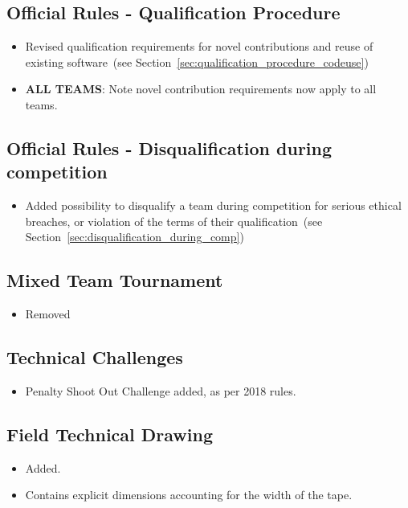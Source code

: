 \documentclass[12pt]{article}
\newcommand{\cf}{see\xspace}
\begin{document}
\subsection*{Official Rules - Qualification Procedure}
\begin{itemize}
  \item Revised qualification requirements for novel contributions and reuse of existing software~(\cf Section~\ref{sec:qualification_procedure_codeuse})
  \item \textbf{ALL TEAMS}: Note novel contribution requirements now apply to all teams.
\end{itemize}


\subsection*{Official Rules - Disqualification during competition}
\begin{itemize}
  \item Added possibility to disqualify a team during competition for serious ethical breaches, or violation of the terms of their qualification~(\cf Section~\ref{sec:disqualification_during_comp})
\end{itemize}

\subsection*{Mixed Team Tournament}
\begin{itemize}
  \item Removed
\end{itemize}

\subsection*{Technical Challenges}
\begin{itemize}
  \item Penalty Shoot Out Challenge added, as per 2018 rules.
\end{itemize}

\subsection*{Field Technical Drawing}
\begin{itemize}
  \item Added.
  \item Contains explicit dimensions accounting for the width of the tape.
\end{itemize}
\end{document}

